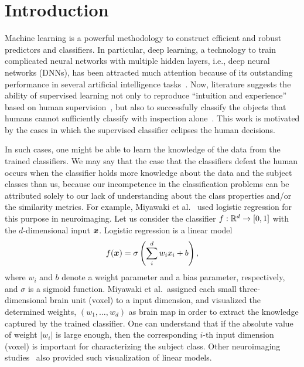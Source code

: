 \section{Introduction}
%
Machine learning is a powerful methodology to construct efficient and robust
predictors and classifiers.
%
In particular, deep learning, a technology to train complicated neural
networks with multiple hidden layers, i.e., deep neural networks (DNNs),
has been attracted much attention because of its outstanding performance in
several artificial intelligence tasks~\cite{krizhevsky2012imagenet,seide2011conversational,DeepFace}.
%
Now, literature suggests the ability of supervised learning not only to reproduce
``intuition and experience'' based on human supervision~\cite{DeepFace},
but also to successfully classify the objects that humans cannot
sufficiently classify with inspection alone~\cite{Horikawa2013,Mural1991}.
%
This work is motivated by the cases in which the supervised
classifier eclipses the human decisions.

%
In such cases, one might be able to learn the knowledge of the data from
the trained classifiers.
%
We may say that the case that the classifiers defeat the human
occurs when the classifier holds more knowledge about the
data and the subject classes than us, because our incompetence in the classification problems
can be attributed solely to our lack of understanding about the class
properties and/or the similarity metrics.
%
For example, Miyawaki et al.~\cite{miyawaki2008visual} used
logistic regression for this purpose in neuroimaging.
%
Let us consider the classifier $f:\mathbb{R}^{d} \rightarrow [0, 1]$ with the
$d$-dimensional input $\mbox{\boldmath $x$}$.
Logistic regression is a linear model
\begin{equation}
 f(\mbox{\boldmath $x$}) = \sigma \left(\sum_{i}^{d} w_i x_i + b\right),
\end{equation}
where $w_i$ and $b$ denote a
weight parameter and a bias parameter, respectively, and $\sigma$ is a sigmoid function.
%
Miyawaki et al.\ assigned each small three-dimensional brain unit
(voxel) to a input dimension,
and visualized the determined weights, $(w_1, \dots, w_d)$
as brain map in order to extract the knowledge captured by the trained classifier.
%
One can understand that if the absolute value of weight $|w_i|$ is large enough, then the
corresponding $i$-th input dimension (voxel) is important for characterizing the
subject class.
%
Other neuroimaging studies~\cite{LaConte2005,yamashita2008sparse,abraham2014machine} also
provided such visualization of linear models.

